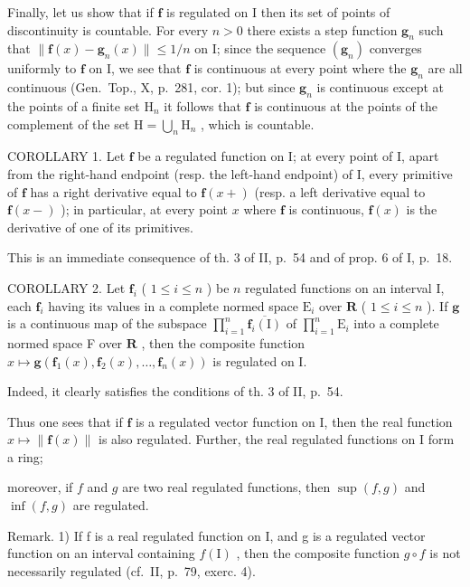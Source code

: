 Finally, let us show that if \(\mathbf{f}\) is regulated on I then its set of points of discontinuity is countable. For every \(n > 0\) there exists a step function \(\mathbf{g}_n\) such that \(\| \mathbf{f}(x) - \mathbf{g}_n(x)\| \leqslant 1 / n\) on I; since the sequence \((\mathbf{g}_n)\) converges uniformly to \(\mathbf{f}\) on I, we see that \(\mathbf{f}\) is continuous at every point where the \(\mathbf{g}_n\) are all continuous (Gen.~Top., X, p.~281, cor. 1); but since \(\mathbf{g}_n\) is continuous except at the points of a finite set \(\mathrm{H}_n\) it follows that \(\mathbf{f}\) is continuous at the points of the complement of the set \(\mathrm{H} = \bigcup_{n}\mathrm{H}_{n}\) , which is countable.

COROLLARY 1. Let \(\mathbf{f}\) be a regulated function on I; at every point of I, apart from the right-hand endpoint (resp. the left-hand endpoint) of I, every primitive of \(\mathbf{f}\) has a right derivative equal to \(\mathbf{f}(x+)\) (resp. a left derivative equal to \(\mathbf{f}(x-)\) ); in particular, at every point \(x\) where \(\mathbf{f}\) is continuous, \(\mathbf{f}(x)\) is the derivative of one of its primitives.

This is an immediate consequence of th. 3 of II, p.~54 and of prop. 6 of I, p.~18.

COROLLARY 2. Let \(\mathbf{f}_i\) ( \(1 \leqslant i \leqslant n\) ) be \(n\) regulated functions on an interval I, each \(\mathbf{f}_i\) having its values in a complete normed space \(\mathrm{E}_i\) over \(\mathbf{R}\) ( \(1 \leqslant i \leqslant n\) ). If \(\mathbf{g}\) is a continuous map of the subspace \(\prod_{i=1}^{n} \overline{\mathbf{f}_i(\mathrm{I})}\) of \(\prod_{i=1}^{n} \mathrm{E}_i\) into a complete normed space F over \(\mathbf{R}\) , then the composite function \(x \mapsto \mathbf{g}(\mathbf{f}_1(x), \mathbf{f}_2(x), \ldots, \mathbf{f}_n(x))\) is regulated on I.

Indeed, it clearly satisfies the conditions of th. 3 of II, p.~54.

Thus one sees that if \(\mathbf{f}\) is a regulated vector function on I, then the real function \(x\mapsto \| \mathbf{f}(x)\|\) is also regulated. Further, the real regulated functions on I form a ring;

moreover, if \(f\) and \(g\) are two real regulated functions, then \(\sup(f, g)\) and \(\inf(f, g)\) are regulated.

Remark. 1) If f is a real regulated function on I, and g is a regulated vector function on an interval containing \(f(\mathrm{I})\) , then the composite function \(g \circ f\) is not necessarily regulated (cf.~II, p.~79, exerc. 4).


